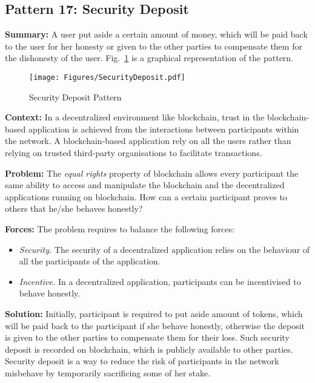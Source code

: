 
\subsection{ \textbf{Pattern 17: Security Deposit}} 
\label{sec:securitydeposit}

\noindent \textbf{Summary:} A user put aside a certain amount of money, which will be paid back to the user for her honesty or given to the other parties to compensate them for the dishonesty of the user. Fig.~\ref{fig:securitydeposit} is a graphical representation of the pattern.


\begin{figure}[t]
\begin{center}
\texttt{[image: Figures/SecurityDeposit.pdf]}
\caption{Security Deposit Pattern}\label{fig:securitydeposit}
\end{center}
\end{figure}

\vspace{0.5em}\noindent \textbf{Context:} 
In a decentralized environment like blockchain, trust in the blockchain-based application is achieved from the interactions between participants within the network. A blockchain-based application rely on all the users rather than relying on trusted third-party organisations to facilitate transactions.

\vspace{0.5em}\noindent \textbf{Problem:} 
The \textit{equal rights} property of blockchain allows every participant the same ability to access and manipulate the blockchain and the decentralized applications running on blockchain. How can a certain participant proves to others that he/she behaves honestly?

\vspace{0.5em}\noindent \textbf{Forces:} The problem requires to balance the following forces:
\begin{itemize}
  \item \textit{Security.} The security of a decentralized application relies on the behaviour of all the participants of the application. 
  \item \textit{Incentive.} In a decentralized application, participants can be incentivised to behave honestly.
\end{itemize}

\vspace{0.5em}\noindent \textbf{Solution:} 
Initially, participant is required to put aside amount of tokens, which will be paid back to the participant if she behave honestly, otherwise the deposit is given to the other parties to compensate them for their loss. Such security deposit is recorded on blockchain, which is publicly available to other parties. Security deposit is a way to reduce the risk of participants in the network misbehave by temporarily sacrificing some of her stake.

